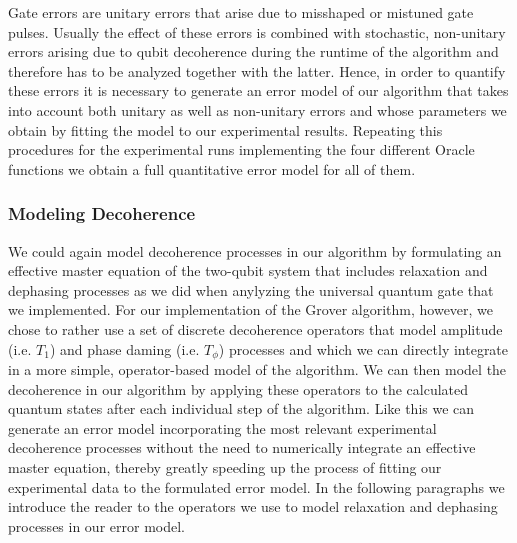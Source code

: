 Gate errors are unitary errors that arise due to misshaped or mistuned gate pulses. Usually the effect of these errors is combined with stochastic, non-unitary errors arising due to qubit decoherence during the runtime of the algorithm and therefore has to be analyzed together with the latter. Hence, in order to quantify these errors it is necessary to generate an error model of our algorithm that takes into account both unitary as well as non-unitary errors and whose parameters we obtain by fitting the model to our experimental results. Repeating this procedures for the experimental runs implementing the four different Oracle functions we obtain a full quantitative error model for all of them.

\subsubsection{Modeling Decoherence}

We could again model decoherence processes in our algorithm by formulating an effective master equation of the two-qubit system that includes relaxation and dephasing processes as we did when anylyzing the universal quantum gate that we implemented. For our implementation of the Grover algorithm, however, we chose to rather use a set of discrete decoherence operators that model amplitude (i.e. $T_1$) and phase daming (i.e. $T_\phi$) processes and which we can directly integrate in a more simple, operator-based model of the algorithm. We can then model the decoherence in our algorithm by applying these operators to the calculated quantum states after each individual step of the algorithm. Like this we can generate an error model incorporating the most relevant experimental decoherence processes without the need to numerically integrate an effective master equation, thereby greatly speeding up the process of fitting our experimental data to the formulated error model. In the following paragraphs we introduce the reader to the operators we use to model relaxation and dephasing processes in our error model.

\smallskip

